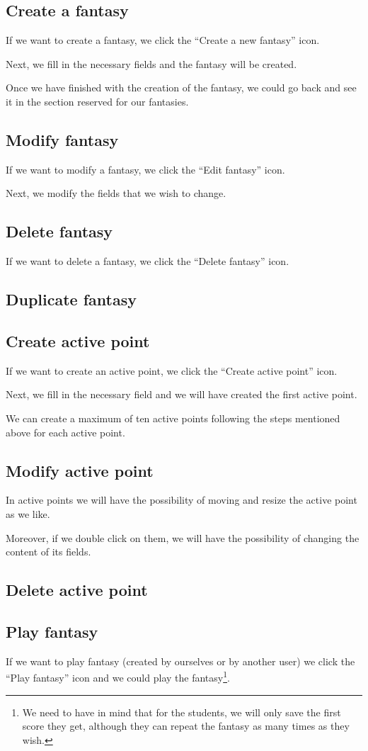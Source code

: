 \subsection{Create a fantasy}
If we want to create a fantasy, we click the ``Create a new fantasy'' icon.

Next, we fill in the necessary fields and the fantasy will be created.

Once we have finished with the creation of the fantasy, we could go back and see it in the section reserved for our fantasies.

\subsection{Modify fantasy}
If we want to modify a fantasy, we click the ``Edit fantasy'' icon.

Next, we modify the fields that we wish to change.

\subsection{Delete fantasy}
If we want to delete a fantasy, we click the ``Delete fantasy'' icon.

\subsection{Duplicate fantasy}

\subsection{Create active point}
If we want to create an active point, we click the ``Create active point'' icon.

Next, we fill in the necessary field and we will have created the first active point.

We can create a maximum of ten active points following the steps mentioned above for each active point.

\subsection{Modify active point}
In active points we will have the possibility of moving and resize the active point as we like.

Moreover, if we double click on them, we will have the possibility of changing the content of its fields.

\subsection{Delete active point}

\subsection{Play fantasy}
If we want to play fantasy (created by ourselves or by another user) we click the ``Play fantasy'' icon and we could play the fantasy\footnote{We need to have in mind that for the students, we will only save the first score they get, although they can repeat the fantasy as many times as they wish.}.